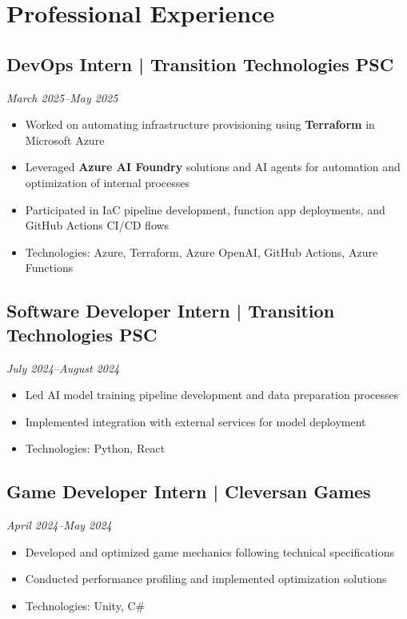 \documentclass[a4paper,10pt]{article}
\begin{document}
\section{Professional Experience}

\subsection{DevOps Intern | Transition Technologies PSC}
\textit{March 2025--May 2025}
\begin{itemize}[leftmargin=0.5cm, nosep]
    \item Worked on automating infrastructure provisioning using \textbf{Terraform} in Microsoft Azure
    \item Leveraged \textbf{Azure AI Foundry} solutions and AI agents for automation and optimization of internal processes
    \item Participated in IaC pipeline development, function app deployments, and GitHub Actions CI/CD flows
    \item Technologies: Azure, Terraform, Azure OpenAI, GitHub Actions, Azure Functions
\end{itemize}

\subsection{Software Developer Intern | Transition Technologies PSC}
\textit{July 2024--August 2024}
\begin{itemize}[leftmargin=0.5cm, nosep]
    \item Led AI model training pipeline development and data preparation processes
    \item Implemented integration with external services for model deployment
    \item Technologies: Python, React
\end{itemize}

\subsection{Game Developer Intern | Cleversan Games}
\textit{April 2024--May 2024}
\begin{itemize}[leftmargin=0.5cm, nosep]
    \item Developed and optimized game mechanics following technical specifications
    \item Conducted performance profiling and implemented optimization solutions
    \item Technologies: Unity, C\#
\end{itemize}
\end{document}

